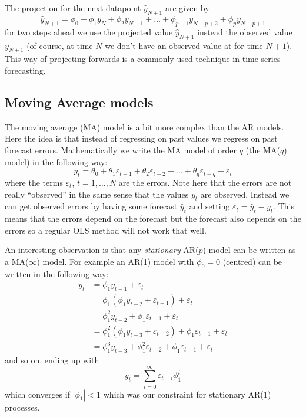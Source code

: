 \documentclass[a4paper, 12pt]{scrartcl}
\begin{document}
The projection for the next datapoint $\hat{y}_{N+1}$ are given by \begin{equation*}
\hat{y}_{N+1}=\phi_0+\phi_1y_N+\phi_2y_{N-1}+\dots+\phi_{p-1}y_{N-p+2}+\phi_py_{N-p+1}
\end{equation*}
for two steps ahead we use the projected value $\hat{y}_{N+1}$ instead the observed value $y_{N+1}$ (of course, at time $N$ we don't have an observed value at for time $N+1$).
This way of projecting forwards is a commonly used technique in time series forecasting.

\subsection{Moving Average models}
The moving average (MA) model is a bit more complex than the AR models.
Here the idea is that instead of regressing on past values we regress on past forecast errors.
Mathematically we write the MA model of order $q$ (the MA($q$) model) in the following way:
\begin{equation*}
	y_t=\theta_0+\theta_1\varepsilon_{t-1}+\theta_2\varepsilon_{t-2}+\dots+\theta_q\varepsilon_{t-q}+\varepsilon_t
\end{equation*}
where the terms $\varepsilon_t$, $t=1,\dots,N$ are the errors.
Note here that the errors are not really ``observed'' in the same sense that the values $y_t$ are observed.
Instead we can get observed errors by having some forecast $\hat{y}_t$ and setting $\varepsilon_t=\hat{y}_t-y_t$.
This means that the errors depend on the forecast but the forecast also depends on the errors so a regular OLS method will not work that well.

An interesting observation is that any \emph{stationary} AR($p$) model can be written as a MA($\infty$) model.
For example an AR(1) model with $\phi_0=0$ (centred) can be written in the following way:
\begin{align*}
	y_t&=\phi_1y_{t-1}+\varepsilon_t\\
	&=\phi_1\left(\phi_1y_{t-2}+\varepsilon_{t-1}\right)+\varepsilon_t\\
	&=\phi_1^2y_{t-2}+\phi_1\varepsilon_{t-1}+\varepsilon_t\\
	&=\phi_1^2\left(\phi_1y_{t-3}+\varepsilon_{t-2}\right)+\phi_1\varepsilon_{t-1}+\varepsilon_t\\
	&=\phi^3_1y_{t-3}+\phi_1^2\varepsilon_{t-2}+\phi_1\varepsilon_{t-1}+\varepsilon_t
\end{align*}
and so on, ending up with
\begin{equation*}
	y_t=\sum_{i=0}^{\infty}\varepsilon_{t-i}\phi^i_1
\end{equation*}
which converges if $|\phi_1|<1$ which was our constraint for stationary AR(1) processes.
\end{document}

